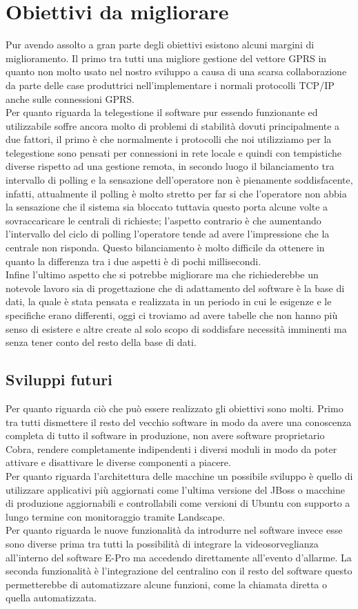 \section{Obiettivi da migliorare}
Pur avendo assolto a gran parte degli obiettivi esistono alcuni margini di miglioramento. Il primo tra tutti una migliore gestione del vettore GPRS in quanto non molto usato nel nostro sviluppo a causa di una scarsa collaborazione da parte delle case produttrici nell'implementare i normali protocolli TCP/IP anche sulle connessioni GPRS.\\
Per quanto riguarda la telegestione il software pur essendo funzionante ed utilizzabile soffre ancora molto di problemi di stabilità dovuti principalmente a due fattori, il primo è che normalmente i protocolli che noi utilizziamo per la telegestione sono pensati per connessioni in rete locale e quindi con tempistiche diverse rispetto ad una gestione remota, in secondo luogo il bilanciamento tra intervallo di polling e la sensazione dell'operatore non è pienamente soddisfacente, infatti, attualmente il polling è molto stretto per far si che l'operatore non abbia la sensazione che il sistema sia bloccato tuttavia questo porta alcune volte a sovraccaricare le centrali di richieste; l'aspetto contrario è che aumentando l'intervallo del ciclo di polling l'operatore tende ad avere l'impressione che la centrale non risponda. Questo bilanciamento è molto difficile da ottenere in quanto la differenza tra i due aspetti è di pochi millisecondi.\\
Infine l'ultimo aspetto che si potrebbe migliorare ma che richiederebbe un notevole lavoro sia di progettazione che di adattamento del software è la base di dati, la quale è stata pensata e realizzata in un periodo in cui le esigenze e le specifiche erano differenti, oggi ci troviamo ad avere tabelle che non hanno più senso di esistere e altre create al solo scopo di soddisfare necessità imminenti ma senza tener conto del resto della base di dati.
\subsection{Sviluppi futuri}
Per quanto riguarda ciò che può essere realizzato gli obiettivi sono molti. Primo tra tutti dismettere il resto del vecchio software in modo da avere una conoscenza completa di tutto il software in produzione, non avere software proprietario Cobra, rendere completamente indipendenti i diversi moduli in modo da poter attivare e disattivare le diverse componenti a piacere.\\
Per quanto riguarda l'architettura delle macchine un possibile sviluppo è quello di utilizzare applicativi più aggiornati come l'ultima versione del JBoss o macchine di produzione aggiornabili e controllabili come versioni di Ubuntu con supporto a lungo termine con monitoraggio tramite Landscape.\\
Per quanto riguarda le nuove funzionalità da introdurre nel software invece esse sono diverse prima tra tutti la possibilità di integrare la videosorveglianza all'interno del software E-Pro ma accedendo direttamente all'evento d'allarme. La seconda funzionalità è l'integrazione del centralino con il resto del software questo permetterebbe di automatizzare alcune funzioni, come la chiamata diretta o quella automatizzata.